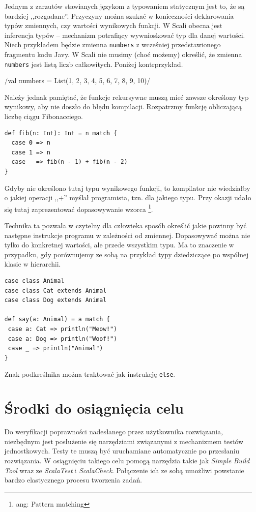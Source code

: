 \documentclass[brudnopis]{xmgr}
\begin{document}
Jednym z zarzutów stawianych językom z typowaniem statycznym jest to, że są bardziej ,,rozgadane''. Przyczyny można szukać w konieczności deklarowania typów zmiennych, czy wartości wynikowych funkcji. W Scali obecna jest inferencja typów -- mechanizm potrafiący wywnioskować typ dla danej wartości. Niech przykładem będzie zmienna \texttt{numbers} z wcześniej przedstawionego fragmentu kodu Javy. W Scali nie musimy (choć możemy) określić, że zmienna \texttt{numbers} jest listą liczb całkowitych. Poniżej kontrprzykład.

/val numbers = List(1, 2, 3, 4, 5, 6, 7, 8, 9, 10)/

Należy jednak pamiętać, że funkcje rekursywne muszą mieć zawsze określony typ wynikowy, aby nie doszło do błędu kompilacji. Rozpatrzmy funkcję obliczającą liczbę ciągu Fibonacciego.

\begin{verbatim}
def fib(n: Int): Int = n match {
  case 0 => n
  case 1 => n
  case _ => fib(n - 1) + fib(n - 2)
}
\end{verbatim}

Gdyby nie określono tutaj typu wynikowego funkcji, to kompilator nie wiedziałby o jakiej operacji ,,+'' myślał programista, tzn. dla jakiego typu. Przy okazji udało się tutaj zaprezentować dopasowywanie wzorca \footnote{ang: Pattern matching}.

Technika ta pozwala w czytelny dla człowieka sposób określić jakie powinny być następne instrukcje programu w zależności od zmiennej. Dopasowywać można nie tylko do konkretnej wartości, ale przede wszystkim typu. Ma to znaczenie w przypadku, gdy porównujemy ze sobą na przykład typy dziedziczące po wspólnej klasie w hierarchii.

\begin{verbatim}
case class Animal
case class Cat extends Animal
case class Dog extends Animal

def say(a: Animal) = a match {
 case a: Cat => println("Meow!")
 case a: Dog => println("Woof!")
 case _ => println("Animal")
}
\end{verbatim}
\label{patternMatching:example}
Znak podkreślnika można traktować jak instrukcję \texttt{else}.

\section{Środki do osiągnięcia celu}

Do weryfikacji poprawności nadesłanego przez użytkownika rozwiązania, niezbędnym jest posłużenie się narzędziami związanymi z mechanizmem testów jednostkowych. Testy te muszą być uruchamiane automatycznie po przesłaniu rozwiązania. W osiągnięciu takiego celu pomogą narzędzia takie jak \textit{Simple Build Tool} wraz ze \textit{ScalaTest} i \textit{ScalaCheck}. Połączenie ich ze sobą umożliwi powstanie bardzo elastycznego procesu tworzenia zadań. 
\end{document}
